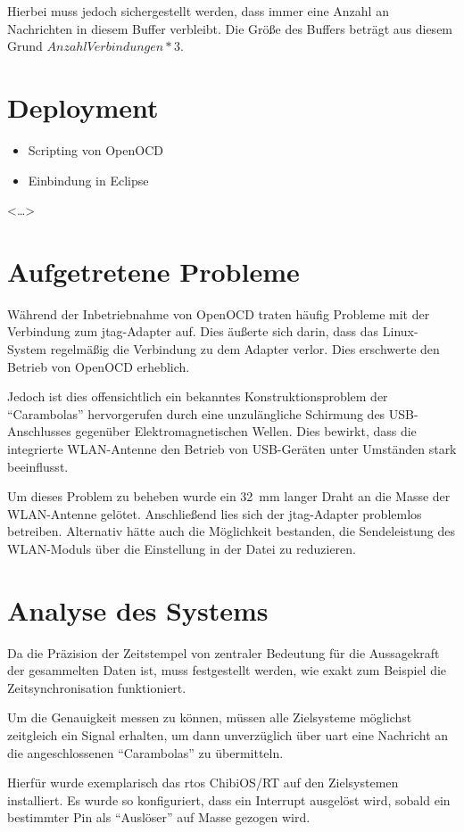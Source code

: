 Hierbei muss jedoch sichergestellt werden, dass immer eine Anzahl an Nachrichten
in diesem Buffer verbleibt. Die Größe des Buffers beträgt aus diesem Grund
$\mathit{AnzahlVerbindungen}*3$.

\section{Deployment}
\begin{itemize}
  \item Scripting von OpenOCD
  \item Einbindung in Eclipse
\end{itemize}
<\ldots>
\section{Aufgetretene Probleme}
Während der Inbetriebnahme von OpenOCD traten häufig Probleme mit der
Verbindung zum \gls{jtag}-Adapter auf. Dies äußerte sich darin, dass das
Linux-System regelmäßig die Verbindung zu dem Adapter verlor. Dies
erschwerte den Betrieb von OpenOCD erheblich.

Jedoch ist dies offensichtlich ein bekanntes Konstruktionsproblem der
"`Carambolas"' hervorgerufen durch eine unzulängliche Schirmung des
USB-Anschlusses gegenüber Elektromagnetischen Wellen.\cite{CARAM2} Dies bewirkt,
dass die integrierte WLAN-Antenne den Betrieb von USB-Geräten unter Umständen
stark beeinflusst.

Um dieses Problem zu beheben wurde ein \SI{32}{\mm} langer Draht an die Masse
der WLAN-Antenne gelötet. Anschließend lies sich der \gls{jtag}-Adapter
problemlos betreiben. Alternativ hätte auch die Möglichkeit bestanden, die
Sendeleistung des WLAN-Moduls über die Einstellung 
in der Datei  zu reduzieren.
\section{Analyse des Systems}
Da die Präzision der Zeitstempel von zentraler Bedeutung für die
Aussagekraft der gesammelten Daten ist, muss festgestellt werden, wie exakt zum Beispiel die
Zeitsynchronisation funktioniert.

Um die Genauigkeit messen zu können, müssen alle Zielsysteme möglichst
zeitgleich ein Signal erhalten, um dann unverzüglich über \gls{uart} eine
Nachricht an die angeschlossenen "`Carambolas"' zu übermitteln.

Hierfür wurde exemplarisch das \gls{rtos} ChibiOS/RT\cite{CHIB} auf den
Zielsystemen installiert. Es wurde so konfiguriert, dass ein Interrupt ausgelöst
wird, sobald ein bestimmter Pin als "`Auslöser"' auf Masse gezogen wird.

